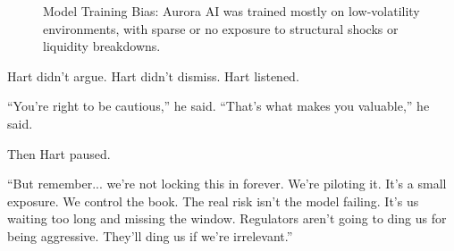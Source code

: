 \medskip

\begin{figure}[H]
  \centering
  \caption{Model Training Bias: Aurora AI was trained mostly on low-volatility environments, with sparse or no exposure to structural shocks or liquidity breakdowns.}
\end{figure}
 
\medskip

Hart didn’t argue. Hart didn’t dismiss.  Hart listened.

``You’re right to be cautious,'' he said.  
``That’s what makes you valuable,'' he said.

Then Hart paused.

``But remember... we’re not locking this in forever. We’re piloting it. It's a small exposure. We control the book. The real 
risk isn’t the model failing. It’s us waiting too long and missing the window. Regulators aren’t going to ding us for being 
aggressive. They’ll ding us if we’re irrelevant.''


